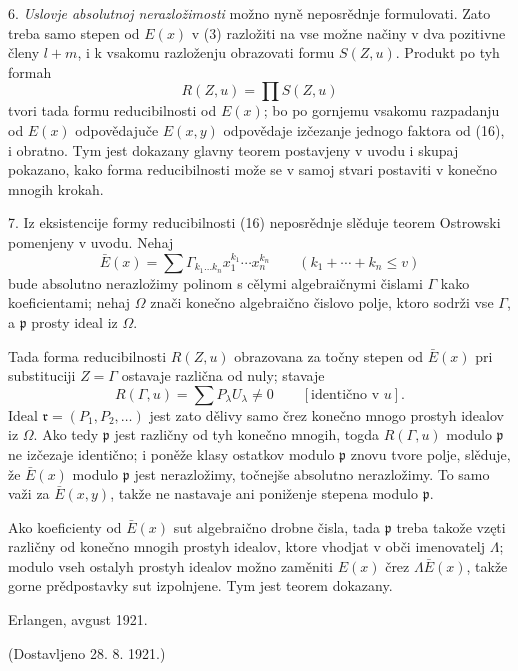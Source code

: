\documentclass[11pt]{article}
\begin{document}
6. \emph{Uslovje absolutnoj nerazložimosti} možno nyně neposrědnje formulovati. Zato treba samo stepen od $E(x)$ v (3) razložiti na vse možne načiny v dva pozitivne členy $l+m$, i k vsakomu razloženju obrazovati formu $S(Z,u)$. Produkt po tyh formah
\begin{equation}
 R(Z,u)=\prod S(Z,u)
\tag{16}
\end{equation}
tvori tada formu reducibilnosti od $E(x)$; bo po gornjemu vsakomu razpadanju od $E(x)$ odpovědajuče $E(x,y)$ odpovědaje izčezanje jednogo faktora od (16), i obratno. Tym jest dokazany glavny teorem postavjeny v uvodu i skupaj pokazano, kako forma reducibilnosti može se v samoj stvari postaviti v konečno mnogih krokah.

7. Iz eksistencije formy reducibilnosti (16) neposrědnje slěduje teorem Ostrowski pomenjeny v uvodu. Nehaj
\[
 \bar E(x)=\sum \Gamma_{k_1\ldots k_n}x_1^{k_1}\cdots x_n^{k_n}
 \qquad(k_1+\cdots+k_n\le v)
\]
bude absolutno nerazložimy polinom s cělymi algebraičnymi čislami $\Gamma$ kako koeficientami; nehaj $\Omega$ znači konečno algebraično čislovo polje, ktoro sodrži vse $\Gamma$, a $\mathfrak p$ prosty ideal iz $\Omega$.

Tada forma reducibilnosti $R(Z,u)$ obrazovana za točny stepen od $\bar E(x)$ pri substituciji $Z=\Gamma$ ostavaje različna od nuly; stavaje
\[
 R(\Gamma,u)=\sum P_\lambda U_\lambda\ne0\qquad[\text{identično v }u].
\]
Ideal $\mathfrak r=(P_1,P_2,\ldots)$ jest zato dělivy samo črez konečno mnogo prostyh idealov iz $\Omega$. Ako tedy $\mathfrak p$ jest različny od tyh konečno mnogih, togda $R(\Gamma,u)$ modulo $\mathfrak p$ ne izčezaje identično; i poněže klasy ostatkov modulo $\mathfrak p$ znovu tvore polje, slěduje, že $\bar E(x)$ modulo $\mathfrak p$ jest nerazložimy, točnejše absolutno nerazložimy. To samo važi za $\bar E(x,y)$, takže ne nastavaje ani poniženje stepena modulo $\mathfrak p$.

Ako koeficienty od $\bar E(x)$ sut algebraično drobne čisla, tada $\mathfrak p$ treba takože vzęti različny od konečno mnogih prostyh idealov, ktore vhodjat v obči imenovatelj $\Lambda$; modulo vseh ostalyh prostyh idealov možno zaměniti $E(x)$ črez $\Lambda\bar E(x)$, takže gorne prědpostavky sut izpolnjene. Tym jest teorem dokazany.

\begin{flushleft}
Erlangen, avgust 1921.
\end{flushleft}
\begin{center}
(Dostavljeno 28. 8. 1921.)
\end{center}

\clearpage
\end{document}
